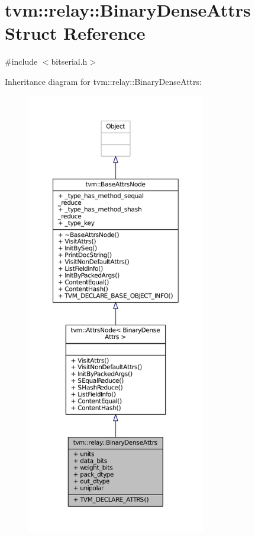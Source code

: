 \hypertarget{structtvm_1_1relay_1_1BinaryDenseAttrs}{}\section{tvm\+:\+:relay\+:\+:Binary\+Dense\+Attrs Struct Reference}
\label{structtvm_1_1relay_1_1BinaryDenseAttrs}


{\ttfamily \#include $<$bitserial.\+h$>$}



Inheritance diagram for tvm\+:\+:relay\+:\+:Binary\+Dense\+Attrs\+:
\nopagebreak
\begin{figure}[H]
\begin{center}
\leavevmode
\includegraphics[height=550pt]{structtvm_1_1relay_1_1BinaryDenseAttrs__inherit__graph}
\end{center}
\end{figure}


